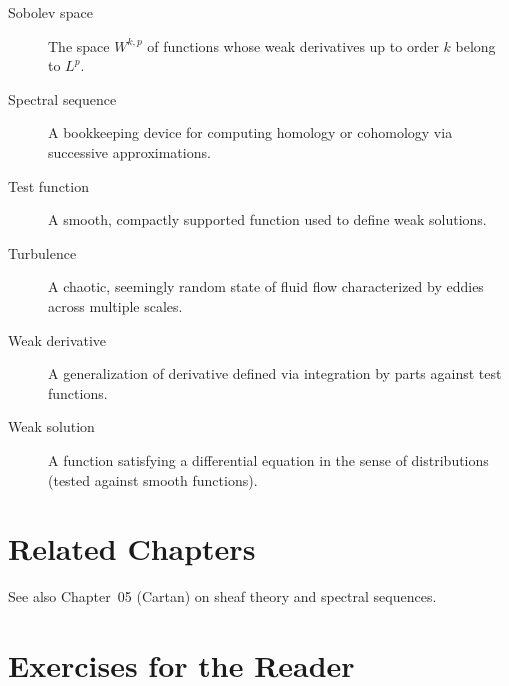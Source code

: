 \begin{description}
    \item[Sobolev space] The space $W^{k,p}$ of functions whose weak derivatives up to order $k$ belong to $L^p$.
    \item[Spectral sequence] A bookkeeping device for computing homology or cohomology via successive approximations.
    \item[Test function] A smooth, compactly supported function used to define weak solutions.
    \item[Turbulence] A chaotic, seemingly random state of fluid flow characterized by eddies across multiple scales.
    \item[Weak derivative] A generalization of derivative defined via integration by parts against test functions.
    \item[Weak solution] A function satisfying a differential equation in the sense of distributions (tested against smooth functions).
\end{description}

\section{Related Chapters}
See also Chapter~05 (Cartan) on sheaf theory and spectral sequences.

\section*{Exercises for the Reader}

